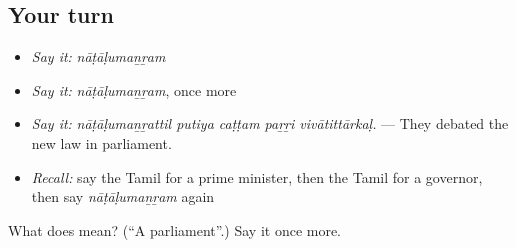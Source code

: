 \subsection*{Your turn}
\begin{itemize}
\raggedright
  \item \emph{Say it:} \emph{nāṭāḷumaṉṟam}
  \item \emph{Say it:} \emph{nāṭāḷumaṉṟam}, once more
  \item \emph{Say it:} \emph{nāṭāḷumaṉṟattil putiya caṭṭam paṟṟi vivātittārkaḷ.} — They debated the new law in parliament.
  \item \emph{Recall:} say the Tamil for a prime minister, then the Tamil for a governor, then say \emph{nāṭāḷumaṉṟam} again
\end{itemize}

\begin{tcolorbox}[breakable,colback=teal!4,colframe=teal!35!black,title={Before you move on}]
What does  mean? (\textquotedblleft{}A parliament\textquotedblright{}.) Say it once more.
\end{tcolorbox}
